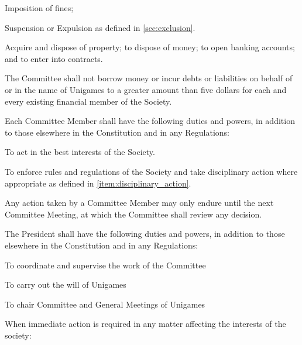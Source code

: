 \documentclass[a4paper]{article}
\begin{document}
\begin{myEnumerate}
\begin{myEnumerate}
\begin{myEnumerate}
                \item Imposition of fines;
                \item Suspension or Expulsion as defined in \cref{sec:exclusion}.
            \end{myEnumerate}
            \item Acquire and dispose of property; to dispose of money; to open banking accounts; and to enter into contracts.
            \begin{myEnumerate}
                \item The Committee shall not borrow money or incur debts or liabilities on behalf of or in the name of Unigames to a greater amount than five dollars for each and every existing financial member of the Society.
            \end{myEnumerate}
            \end{myEnumerate}
        \item Each Committee Member shall have the following duties and powers, in addition to those elsewhere in the Constitution and in any Regulations:
        \begin{myEnumerate}
            \item To act in the best interests of the Society.
            \item To enforce rules and regulations of the Society and take disciplinary action where appropriate as defined in \cref{item:disciplinary_action}.
            \begin{myEnumerate}
                \item Any action taken by a Committee Member may only endure until the next Committee Meeting, at which the Committee shall review any decision.
            \end{myEnumerate}
        \end{myEnumerate}
        \item \label{item:pres_duties} The President shall have the following duties and powers, in addition to those elsewhere in the Constitution and in any Regulations:
              \begin{myEnumerate}
                  \item To coordinate and supervise the work of the Committee
                  \item To carry out the will of Unigames
                  \item To chair Committee and General Meetings of Unigames
                  \item When immediate action is required in any matter affecting the interests of the society:

\end{myEnumerate}
\end{myEnumerate}
\end{document}
